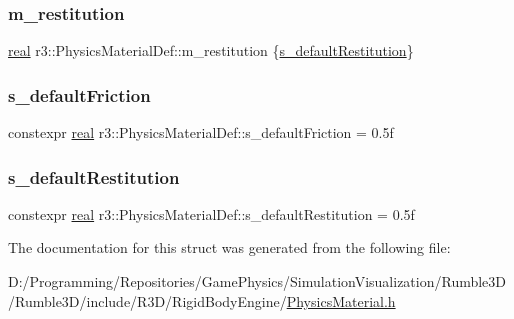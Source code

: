 \subsubsection{\texorpdfstring{m\+\_\+restitution}{m\_restitution}}
{\footnotesize\ttfamily \mbox{\hyperlink{namespacer3_ab2016b3e3f743fb735afce242f0dc1eb}{real}} r3\+::\+Physics\+Material\+Def\+::m\+\_\+restitution \{\mbox{\hyperlink{structr3_1_1_physics_material_def_a994308068cb88f266dd5f9f63f320add}{s\+\_\+default\+Restitution}}\}}

\mbox{\label{structr3_1_1_physics_material_def_a491a5e29b693bd20a7a8708f13c7f473}} 
\subsubsection{\texorpdfstring{s\+\_\+default\+Friction}{s\_defaultFriction}}
{\footnotesize\ttfamily constexpr \mbox{\hyperlink{namespacer3_ab2016b3e3f743fb735afce242f0dc1eb}{real}} r3\+::\+Physics\+Material\+Def\+::s\+\_\+default\+Friction = 0.\+5f\hspace{0.3cm}{\ttfamily [static]}}

\mbox{\label{structr3_1_1_physics_material_def_a994308068cb88f266dd5f9f63f320add}} 
\subsubsection{\texorpdfstring{s\+\_\+default\+Restitution}{s\_defaultRestitution}}
{\footnotesize\ttfamily constexpr \mbox{\hyperlink{namespacer3_ab2016b3e3f743fb735afce242f0dc1eb}{real}} r3\+::\+Physics\+Material\+Def\+::s\+\_\+default\+Restitution = 0.\+5f\hspace{0.3cm}{\ttfamily [static]}}



The documentation for this struct was generated from the following file\+:\begin{DoxyCompactItemize}
\item 
D\+:/\+Programming/\+Repositories/\+Game\+Physics/\+Simulation\+Visualization/\+Rumble3\+D/\+Rumble3\+D/include/\+R3\+D/\+Rigid\+Body\+Engine/\mbox{\hyperlink{_physics_material_8h}{Physics\+Material.\+h}}\end{DoxyCompactItemize}
